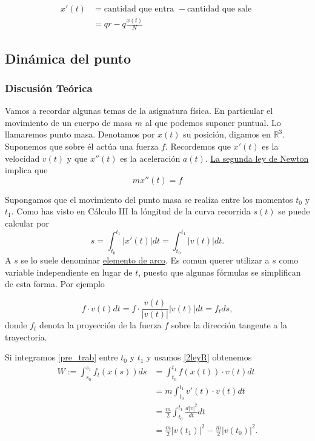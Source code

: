 \documentclass{article}
\newcommand{\rr}{\mathbb{R}}
\newcounter{ejemplo_cont}
\begin{document}
\[\begin{split}
   x'(t)&=\text{cantidad que entra }-\text{cantidad que sale }\\
          &=qr-q\frac{x(t)}{N}
  \end{split}
\]




\subsection{Dinámica del punto}

\subsubsection{Discusión Teórica}
Vamos a recordar algunas temas de la asignatura física. En particular  el movimiento de un cuerpo de masa $m$ al que podemos suponer puntual. Lo llamaremos punto masa. Denotamos por $x(t)$ su posición, digamos en $\rr^3$. Suponemos
que sobre él actúa una fuerza $f$. Recordemos que $x'(t)$ es la velocidad $v(t)$ y que $x''(t)$ es la aceleración $a(t)$.  
\href{http://es.wikipedia.org/wiki/Leyes_de_Newton\#Segunda_ley_de_Newton_o_ley_de_fuerza}{La segunda ley de Newton} implica que 
\begin{equation}\label{2leyR}\boxed{mx''(t)=f}\end{equation}


Supongamos que el movimiento del punto masa se realiza entre los momentos $t_0$ y $t_1$. Como has visto en Cálculo III la lóngitud de la curva recorrida 
$s(t)$ se puede calcular por
\begin{equation}\label{2ley}s=\int_{t_0}^{t_1}|x'(t)|dt=\int_{t_0}^{t_1}|v(t)|dt.\end{equation}
A $s$ se lo suele denominar \href{http://es.wikipedia.org/wiki/Longitud_de_arco}{elemento de arco}. Es comun querer utilizar a $s$ como variable independiente en 
lugar de $t$, puesto que algunas fórmulas se simplifican de esta forma. Por ejemplo

\begin{equation}\label{pre_trab} f\cdot v(t)dt=f\cdot\frac{v(t)}{|v(t)|}|v(t)|dt=f_tds,\end{equation}
donde $f_t$ denota la proyección de la fuerza $f$ sobre la dirección tangente a la trayectoria.





Si integramos \eqref{pre_trab} entre $t_0$ y $t_1$ y usamos \eqref{2leyR} obtenemos
\[\begin{split} W:=\int_{s_0}^{s_1}f_t(x(s))ds&=\int_{t_0}^{t_1} f(x(t))\cdot v(t)dt\\
   & =m \int_{t_0}^{t_1} v'(t)\cdot v(t)dt\\
   &=\frac{m}{2} \int_{t_0}^{t_1} \frac{d|v|^2}{dt}dt\\
   &=\frac{m}{2}|v(t_1)|^2-\frac{m}{2}|v(t_0)|^2.  \end{split}\]
\end{document}
